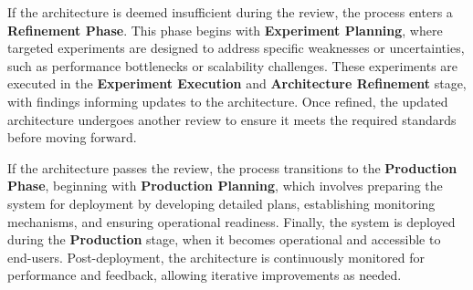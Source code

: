 If the architecture is deemed insufficient during the review, the process enters a \textbf{Refinement Phase}. This phase begins with \textbf{Experiment Planning}, where targeted experiments are designed to address specific weaknesses or uncertainties, such as performance bottlenecks or scalability challenges. These experiments are executed in the \textbf{Experiment Execution} and \textbf{Architecture Refinement} stage, with findings informing updates to the architecture. Once refined, the updated architecture undergoes another review to ensure it meets the required standards before moving forward.

If the architecture passes the review, the process transitions to the \textbf{Production Phase}, beginning with \textbf{Production Planning}, which involves preparing the system for deployment by developing detailed plans, establishing monitoring mechanisms, and ensuring operational readiness. Finally, the system is deployed during the \textbf{Production} stage, when it becomes operational and accessible to end-users. Post-deployment, the architecture is continuously monitored for performance and feedback, allowing iterative improvements as needed.